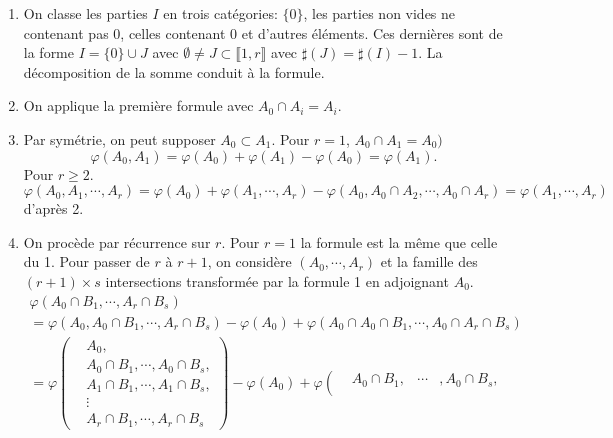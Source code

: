 \begin{demo}
  \begin{enumerate}
    \item On classe les parties $I$ en trois catégories: $\{ 0 \}$, les parties non vides ne contenant pas $0$, celles contenant $0$ et d'autres éléments. Ces dernières sont de la forme $I = \{ 0 \}\cup J$ avec $\emptyset \neq J \subset \llbracket 1, r \rrbracket$ avec $\sharp(J) = \sharp(I) -1$. La décomposition de la somme conduit à la formule.
    \item On applique la première formule avec $A_0 \cap A_i = A_i$.
    \item Par symétrie, on peut supposer $A_0 \subset A_1$. Pour $r = 1$, $A_0 \cap A_1 = A_0)$
    \begin{displaymath}
      \varphi(A_0, A_1) = \varphi(A_0) + \varphi(A_1) - \varphi(A_0) = \varphi(A_1).
    \end{displaymath}
    Pour $r\geq 2$.
    \begin{displaymath}
      \varphi(A_0,A_1, \cdots,A_r) = \varphi(A_0) + \varphi(A_1, \cdots,A_r) - \varphi(A_0,A_0 \cap A_2, \cdots , A_0\cap A_r) = \varphi(A_1, \cdots,A_r)
    \end{displaymath}
    d'après 2.
    \item On procède par récurrence sur $r$. Pour $r=1$ la formule est la même que celle du 1.\newline
    Pour passer de $r$ à $r+1$, on considère $(A_0, \cdots,A_r)$ et la famille des $(r+1)\times s$ intersections transformée par la formule 1 en adjoignant $A_0$.
    \begin{multline*}
      \varphi(A_0\cap B_1, \cdots, A_r \cap B_s) \\
      = \varphi(A_0, A_0\cap B_1, \cdots, A_r \cap B_s) -\varphi(A_0) + \varphi(A_0\cap A_0\cap B_1, \cdots, A_0\cap A_r \cap B_s)\\
      = \varphi \left(
      \begin{aligned}
      &A_0, \\
      &A_0 \cap B_1, \cdots, A_0\cap B_s, \\
      &A_1 \cap B_1, \cdots, A_1\cap B_s, \\
      & \vdots  \\
      &A_r \cap B_1, \cdots, A_r\cap B_s
      \end{aligned}
      \right)
      -\varphi(A_0) 
      + \varphi \left(
      \begin{aligned}
        & A_0\cap B_1, &\cdots &, A_0 \cap B_s, \\

\end{aligned}
\end{multline*}
\end{enumerate}
\end{demo}
